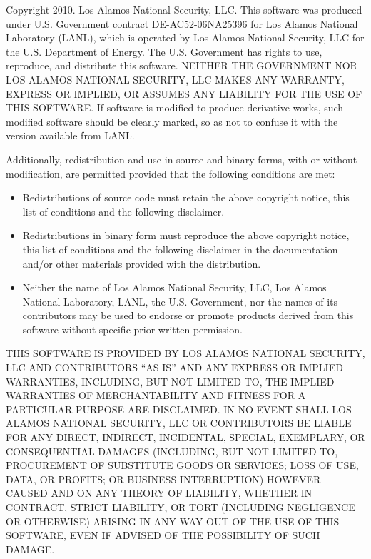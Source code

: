 \begingroup
\footnotesize
\setlength{\parindent}{0pt}
\setlength{\parskip}{\baselineskip}

Copyright \textcopyright{} 2010. Los Alamos National Security,
LLC. This software was produced under U.S. Government contract
DE-AC52-06NA25396 for Los Alamos National Laboratory (LANL), which is
operated by Los Alamos National Security, LLC for the U.S. Department
of Energy. The U.S. Government has rights to use, reproduce, and
distribute this software.  NEITHER THE GOVERNMENT NOR LOS ALAMOS
NATIONAL SECURITY, LLC MAKES ANY WARRANTY, EXPRESS OR IMPLIED, OR
ASSUMES ANY LIABILITY FOR THE USE OF THIS SOFTWARE.  If software is
modified to produce derivative works, such modified software should be
clearly marked, so as not to confuse it with the version available
from LANL.

Additionally, redistribution and use in source and binary forms, with
or without modification, are permitted provided that the following
conditions are met:

\begin{itemize}

  \item Redistributions of source code must retain the above copyright
    notice, this list of conditions and the following disclaimer.

  \item Redistributions in binary form must reproduce the above
    copyright notice, this list of conditions and the following
    disclaimer in the documentation and/or other materials provided
    with the distribution.

  \item Neither the name of Los Alamos National Security, LLC, Los
    Alamos National Laboratory, LANL, the U.S. Government, nor the
    names of its contributors may be used to endorse or promote
    products derived from this software without specific prior written
    permission.
\end{itemize}


THIS SOFTWARE IS PROVIDED BY LOS ALAMOS NATIONAL SECURITY, LLC AND
CONTRIBUTORS ``AS IS'' AND ANY EXPRESS OR IMPLIED WARRANTIES,
INCLUDING, BUT NOT LIMITED TO, THE IMPLIED WARRANTIES OF
MERCHANTABILITY AND FITNESS FOR A PARTICULAR PURPOSE ARE
DISCLAIMED. IN NO EVENT SHALL LOS ALAMOS NATIONAL SECURITY, LLC OR
CONTRIBUTORS BE LIABLE FOR ANY DIRECT, INDIRECT, INCIDENTAL, SPECIAL,
EXEMPLARY, OR CONSEQUENTIAL DAMAGES (INCLUDING, BUT NOT LIMITED TO,
PROCUREMENT OF SUBSTITUTE GOODS OR SERVICES; LOSS OF USE, DATA, OR
PROFITS; OR BUSINESS INTERRUPTION) HOWEVER CAUSED AND ON ANY THEORY OF
LIABILITY, WHETHER IN CONTRACT, STRICT LIABILITY, OR TORT (INCLUDING
NEGLIGENCE OR OTHERWISE) ARISING IN ANY WAY OUT OF THE USE OF THIS
SOFTWARE, EVEN IF ADVISED OF THE POSSIBILITY OF SUCH DAMAGE.
\endgroup

\clearpage
